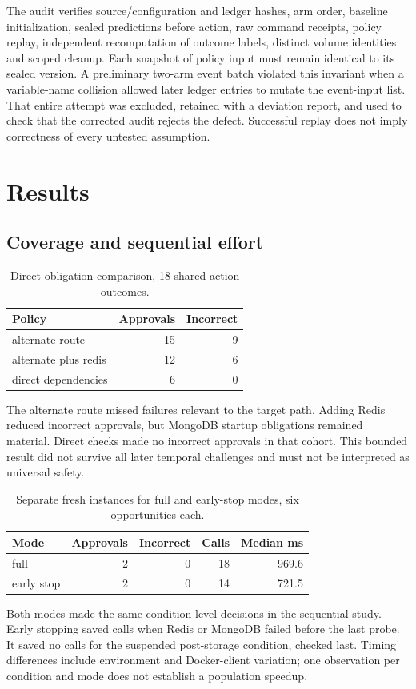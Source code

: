 \documentclass[11pt]{article}
\begin{document}
The audit verifies source/configuration and ledger hashes, arm order, baseline initialization, sealed predictions before action, raw command receipts, policy replay, independent recomputation of outcome labels, distinct volume identities and scoped cleanup. Each snapshot of policy input must remain identical to its sealed version. A preliminary two-arm event batch violated this invariant when a variable-name collision allowed later ledger entries to mutate the event-input list. That entire attempt was excluded, retained with a deviation report, and used to check that the corrected audit rejects the defect. Successful replay does not imply correctness of every untested assumption.

\section{Results}
\subsection{Coverage and sequential effort}
\begin{table}[ht]
\centering\small
\begin{tabular}{lrr}
\toprule
Policy & Approvals & Incorrect \\
\midrule
alternate route & 15 & 9 \\
alternate plus redis & 12 & 6 \\
direct dependencies & 6 & 0 \\
\bottomrule
\end{tabular}
\caption{Direct-obligation comparison, 18 shared action outcomes.}
\end{table}
The alternate route missed failures relevant to the target path. Adding Redis reduced incorrect approvals, but MongoDB startup obligations remained material. Direct checks made no incorrect approvals in that cohort. This bounded result did not survive all later temporal challenges and must not be interpreted as universal safety.

\begin{table}[ht]
\centering\small
\begin{tabular}{lrrrr}
\toprule
Mode & Approvals & Incorrect & Calls & Median ms \\
\midrule
full & 2 & 0 & 18 & 969.6 \\
early stop & 2 & 0 & 14 & 721.5 \\
\bottomrule
\end{tabular}
\caption{Separate fresh instances for full and early-stop modes, six opportunities each.}
\end{table}
Both modes made the same condition-level decisions in the sequential study. Early stopping saved calls when Redis or MongoDB failed before the last probe. It saved no calls for the suspended post-storage condition, checked last. Timing differences include environment and Docker-client variation; one observation per condition and mode does not establish a population speedup.
\end{document}
